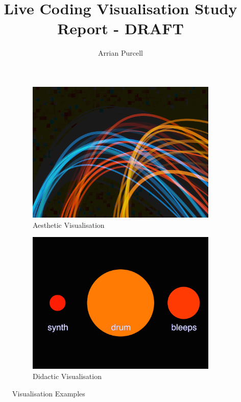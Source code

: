 \documentclass{article}
\begin{document}
\title{Live Coding Visualisation Study Report - DRAFT}
\author{Arrian Purcell}

\maketitle

\begin{figure}[t]
\centering
\begin{subfigure}{.5\textwidth}
    \centering
    \includegraphics[width=0.9\linewidth]{aesthetic-vis.png}
    \caption{Aesthetic Visualisation}
    \label{avis}
\end{subfigure}%
\begin{subfigure}{.5\textwidth}
    \centering
    \includegraphics[width=0.9\linewidth]{didactic-vis.png}
    \caption{Didactic Visualisation}
    \label{dvis}
\end{subfigure}
\caption{Visualisation Examples}
\end{figure}
\end{document}
